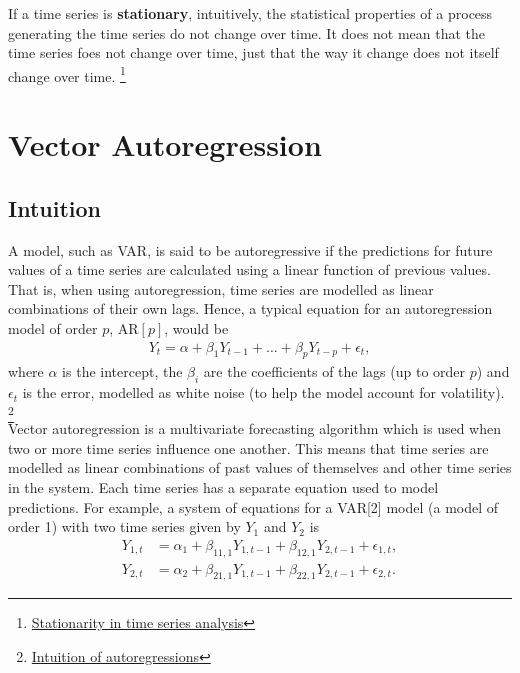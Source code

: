 \documentclass[11pt]{article}
\begin{document}
If a time series is \textbf{stationary}, intuitively, the statistical properties of a process generating the time series do not change over time. It does not mean that the time series foes not change over time, just that the way it change does not itself change over time. \footnote[4]{\href{https://towardsdatascience.com/stationarity-in-time-series-analysis-90c94f27322}{Stationarity in time series analysis}}

\pagebreak

\section{Vector Autoregression}

\subsection{Intuition}
A model, such as VAR, is said to be autoregressive if the predictions for future values of a time series are calculated using a linear function of previous values. That is, when using autoregression, time series are modelled as linear combinations of their own lags. Hence, a typical equation for an autoregression model of order $p$, AR$[p]$, would be
\begin{align*}
	Y_t = \alpha + \beta_1 Y_{t-1} + ... + \beta_p Y_{t-p} + \epsilon_t,
\end{align*}
where $\alpha$ is the intercept, the $\beta_i$ are the coefficients of the lags (up to order $p$) and $\epsilon_t$ is the error, modelled as white noise (to help the model account for volatility). \footnote[1]{\href{https://www.machinelearningplus.com/time-series/vector-autoregression-examples-python/}{Intuition of autoregressions}}\\

Vector autoregression is a multivariate forecasting algorithm which is used when two or more time series influence one another. This means that time series are modelled as linear combinations of past values of themselves and other time series in the system. Each time series has a separate equation used to model predictions. For example, a system of equations for a VAR[2] model (a model of order 1) with two time series given by $Y_1$ and $Y_2$ is
\begin{align*}
	Y_{1, t} &= \alpha_1 + \beta_{11, 1} Y_{1, t-1} + \beta_{12, 1} Y_{2, t-1} + \epsilon_{1, t}, \\
	Y_{2, t} &= \alpha_2 + \beta_{21, 1} Y_{1, t-1} + \beta_{22, 1} Y_{2, t-1} + \epsilon_{2, t}.
\end{align*} 
\end{document}
